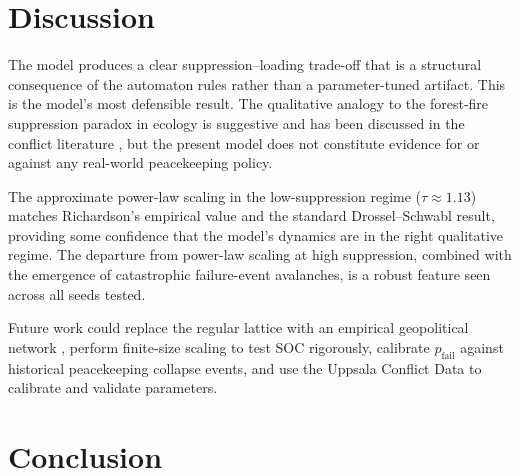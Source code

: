 \documentclass[12pt,a4paper]{article}
\begin{document}
\section{Discussion}

The model produces a clear suppression--loading trade-off that is a structural
consequence of the automaton rules rather than a parameter-tuned artifact. This is the
model's most defensible result. The qualitative analogy to the forest-fire suppression
paradox in ecology \citep{pyne2019} is suggestive and has been discussed in the
conflict literature \citep{cederman2003}, but the present model does not constitute
evidence for or against any real-world peacekeeping policy.

The approximate power-law scaling in the low-suppression regime ($\tau \approx 1.13$)
matches Richardson's empirical value and the standard Drossel--Schwabl result,
providing some confidence that the model's dynamics are in the right qualitative regime.
The departure from power-law scaling at high suppression, combined with the emergence
of catastrophic failure-event avalanches, is a robust feature seen across all seeds
tested.

Future work could replace the regular lattice with an empirical geopolitical network
\citep{correlatesofwar2014}, perform finite-size scaling to test SOC rigorously,
calibrate $p_{\text{fail}}$ against historical peacekeeping collapse events, and use the
Uppsala Conflict Data \citep{gleditsch2002} to calibrate and validate parameters.

\section{Conclusion}
\end{document}
